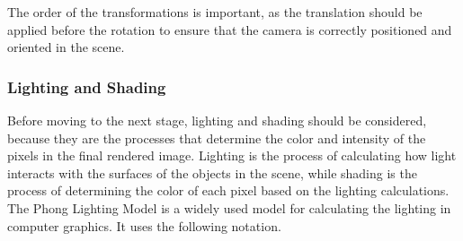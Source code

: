 The order of the transformations is important, as the translation should be applied before the rotation to ensure that the camera is correctly positioned and oriented in the scene.

\subsubsection{Lighting and Shading}

Before moving to the next stage, lighting and shading should be considered, because they are the processes that determine the color and intensity of the pixels in the final rendered image. Lighting is the process of calculating how light interacts with the surfaces of the objects in the scene, while shading is the process of determining the color of each pixel based on the lighting calculations. The Phong Lighting Model is a widely used model for calculating the lighting in computer graphics. It uses the following notation.
